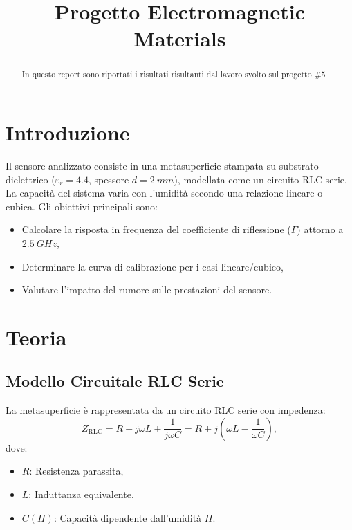 \documentclass[conference]{IEEEtran}
\begin{document}
\title{Progetto Electromagnetic Materials}

\author{
}


\maketitle

\begin{abstract}
In questo report sono riportati i risultati risultanti dal lavoro svolto sul progetto $\#5$
\end{abstract}


\section{Introduzione}
Il sensore analizzato consiste in una metasuperficie stampata su substrato dielettrico  (\(\varepsilon_r = 4.4\), spessore \(d = \SI{2}{mm}\)), modellata come un circuito RLC serie. La capacità del sistema varia con l'umidità secondo una relazione lineare o cubica. Gli obiettivi principali sono:
\begin{itemize}
    \item Calcolare la risposta in frequenza del coefficiente di riflessione (\(\Gamma\)) attorno a \(\SI{2.5}{GHz}\),
    \item Determinare la curva di calibrazione per i casi lineare/cubico,
    \item Valutare l'impatto del rumore sulle prestazioni del sensore.
\end{itemize}


\section{Teoria}
\subsection{Modello Circuitale RLC Serie}
La metasuperficie è rappresentata da un circuito RLC serie con impedenza:
\begin{equation}
    Z_{\text{RLC}} = R + j\omega L + \frac{1}{j\omega C} = R + j\left(\omega L - \frac{1}{\omega C}\right),
\end{equation}
dove:
\begin{itemize}
    \item \(R \): Resistenza parassita,
    \item \(L \): Induttanza equivalente,
    \item \(C(H)\): Capacità dipendente dall'umidità \(H\).
\end{itemize}
\end{document}
